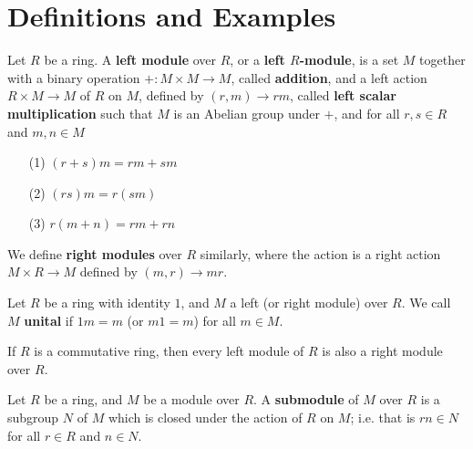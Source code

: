 \section{Definitions and Examples}

\begin{definition}
    Let $R$ be a ring. A  \textbf{left module} over $R$, or a  \textbf{left
    $R$-module}, is a set $M$ together with a binary operation  $+:M \times M
    \xrightarrow{} M$, called \textbf{addition}, and a left action $R \times M
    \xrightarrow{} M$ of $R$ on $M$, defined by $(r,m) \xrightarrow{} rm$,
    called  \textbf{left scalar multiplication} such that $M$ is an Abelian group
    under $+$, and for all $r,s \in R$ and $m,n \in M$
    \begin{enumerate}
        \item[(1)] $(r+s)m=rm+sm$

        \item[(2)] $(rs)m=r(sm)$

        \item[(3)] $r(m+n)=rm+rn$
    \end{enumerate}
    We define \textbf{right modules} over $R$ similarly, where the action is a
    right action $M \times R \xrightarrow{} M$ defined by $(m,r) \xrightarrow{}
    mr$.
\end{definition}

\begin{definition}
    Let $R$ be a ring with identity  $1$, and  $M$ a left  (or right module)
    over $R$. We call  $M$  \textbf{unital} if $1m=m$ (or $m1=m$) for all
    $m \in M$.
\end{definition}

\begin{lemma}\label{4.1.1}
    If $R$ is a commutative ring, then every left module of $R$ is also a right
    module over $R$.
\end{lemma}

\begin{definition}
    Let $R$ be a ring, and $M$ be a module over $R$. A \textbf{submodule} of $M$
    over  $R$ is a subgroup $N$ of $M$ which is closed under the action of  $R$
    on $M$; i.e. that is $rn \in N$ for all  $r \in R$ and  $n \in N$.
\end{definition}


